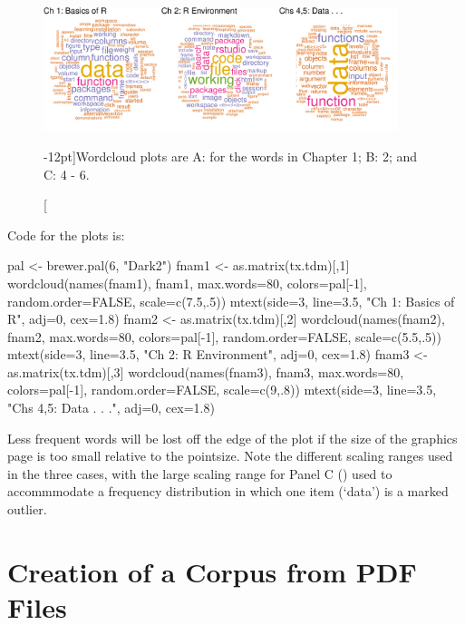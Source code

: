 \begin{figure}
\begin{Schunk}


\centerline{\includegraphics[width=0.92\textwidth]{figs/10-wordcloud1-3-1} }

\end{Schunk}
\caption[][-12pt]{Wordcloud plots are A: for the words in Chapter 1; B: 2; and C: 4 - 6.\label{fig:wc}}
\end{figure}

\vspace*{-9pt}

\noindent
Code for the plots is:
\begin{fullwidth}
\begin{Schunk}
\begin{Sinput}
pal <- brewer.pal(6, "Dark2")
fnam1 <- as.matrix(tx.tdm)[,1]
wordcloud(names(fnam1), fnam1, max.words=80, colors=pal[-1],
          random.order=FALSE, scale=c(7.5,.5))
mtext(side=3, line=3.5, "Ch 1: Basics of R", adj=0, cex=1.8)
fnam2 <- as.matrix(tx.tdm)[,2]
wordcloud(names(fnam2), fnam2, max.words=80, colors=pal[-1],
          random.order=FALSE, scale=c(5.5,.5))
mtext(side=3, line=3.5, "Ch 2: R Environment", adj=0, cex=1.8)
fnam3 <- as.matrix(tx.tdm)[,3]
wordcloud(names(fnam3), fnam3, max.words=80, colors=pal[-1],
          random.order=FALSE, scale=c(9,.8))
mtext(side=3, line=3.5, "Chs 4,5: Data . . .", adj=0, cex=1.8)
\end{Sinput}
\end{Schunk}
\end{fullwidth}
 Less frequent words will be lost off the
edge of the plot if the size of the graphics page is too small
relative to the pointsize.  Note the different scaling ranges used in
the three cases, with the large scaling range for Panel C
() used to accommmodate a frequency distribution
in which one item (`data') is a marked outlier.

\section{Creation of a Corpus from PDF Files}

